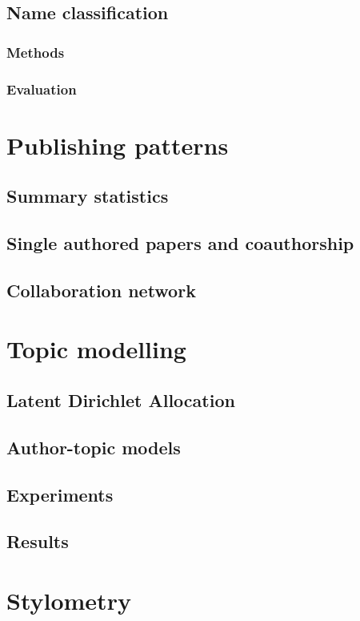 \documentclass[bsc,frontabs,twoside,singlespacing,parskip,deptreport]{infthesis}     %
\begin{document}
\section{Name classification}
\subsection{Methods}
\subsection{Evaluation}

\chapter{Publishing patterns}
\label{ch:publ}
\section{Summary statistics}
\section{Single authored papers and coauthorship}
\section{Collaboration network}

\chapter{Topic modelling}
\label{ch:topics}
\section{Latent Dirichlet Allocation}
\section{Author-topic models}
\section{Experiments}
\section{Results}

\chapter{Stylometry}
\label{ch:style}
\end{document}
